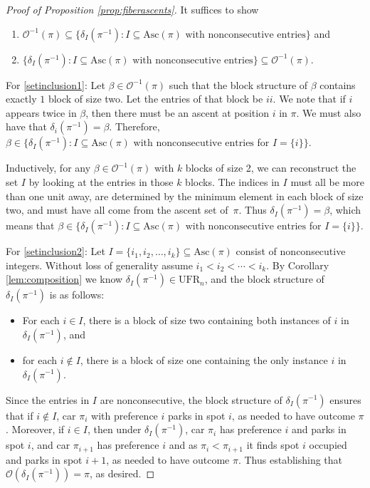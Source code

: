 \documentclass[11pt,reqno]{amsart}
\newcommand*{\Out}{\mathcal{O}}
\newcommand{\Asc}{\mathrm{Asc}}
\theoremstyle{definition}
\theoremstyle{notation}
\theoremstyle{openproblem}
\newcommand{\UFR}[1]{\text{UFR}_{#1}}
\begin{document}
    
\begin{proof}[Proof of Proposition \ref{prop:fiberascents}]
It suffices to show
\begin{enumerate}
    \item $\Out^{-1}(\pi)\subseteq \{\delta_I(\pi^{-1}): I\subseteq \Asc(\pi) \mbox{ with nonconsecutive entries}\}$ and \label{setinclusion1}
    \item $ \{\delta_I(\pi^{-1}): I\subseteq \Asc(\pi) \mbox{ with nonconsecutive entries}\} \subseteq \Out^{-1}(\pi)$.\label{setinclusion2}
\end{enumerate}

\noindent For \eqref{setinclusion1}: Let $\beta \in \Out^{-1}(\pi)$ such that the block structure of $\beta$ contains exactly $1$ block of size two. 
Let the entries of that block be $ii$.
We note that if $i$ appears twice in $\beta$, then there must be an ascent at position $i$ in $\pi$. We must also have that $\delta_i(\pi^{-1}) = \beta$. 
Therefore, $\beta \in \{\delta_I(\pi^{-1}): I\subseteq \Asc(\pi) \mbox{ with nonconsecutive entries}$ for $I=\{ i\}\}$. 

Inductively, for any $\beta \in \Out^{-1}(\pi)$ with $k$ blocks of size 2, we can reconstruct the set $I$ by looking at the entries in those $k$ blocks. The indices in $I$ must all be more than one unit away, are determined by the minimum element in each block of size two, and must have all come from the ascent set of~$\pi$. Thus $\delta_I(\pi^{-1}) = \beta$, which means that $\beta \in \{\delta_I(\pi^{-1}): I\subseteq \Asc(\pi) \mbox{ with nonconsecutive entries}$ for $I=\{ i\}\}$.

\noindent For \eqref{setinclusion2}:
Let $I=\{i_1,i_2,\ldots,i_k\}\subseteq \Asc(\pi)$ consist of nonconsecutive integers. 
Without loss of generality assume $i_1<i_2<\cdots<i_k$. 
By Corollary \ref{lem:composition} we know $\delta_I(\pi^{-1})\in \UFR{n}$,
and the block structure of $\delta_I(\pi^{-1})$ is as follows:
\begin{itemize}[leftmargin=.2in]
    \item For each $i\in I$, there is a block of size two containing both instances of $i$ in $\delta_I(\pi^{-1})$, and 
    \item for each  $i\notin I$, there is a block of size one containing the only instance $i$ in $\delta_I(\pi^{-1})$.
\end{itemize}
Since the entries in $I$ are nonconsecutive, the block structure of $\delta_I(\pi^{-1})$ ensures that 
if $i\notin I$, car $\pi_i$ with preference $i$ parks in spot $i$, as needed to have outcome $\pi$. Moreover, if $i\in I$, then under $\delta_{I}(\pi^{-1})$, car $\pi_i$ has preference $i$ and parks in spot $i$, and car $\pi_{i+1}$ has preference $i$ and as $\pi_i<\pi_{i+1}$ it finds spot $i$ occupied and parks in spot $i+1$, as needed to have outcome $\pi$. Thus establishing that $\Out(\delta_I(\pi^{-1}))=\pi$, as desired.
\end{proof}
\end{document}
